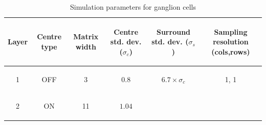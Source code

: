 \documentclass{frontiersENG} %
\newenvironment{mycell}[1]
{
	\begin{minipage}{#1}
		\begin{center}
			\vspace*{0.15cm}
		}
		{
			\vspace*{0.1cm}
		\end{center}
	\end{minipage}
}
\newenvironment{mycellS}[1]
{
  \begin{minipage}{#1}
    \begin{center}
    }
    {
      \vspace*{0.01cm}
    \end{center}
  \end{minipage}
}
\begin{document}
\begin{table}[htb]
	\caption{Simulation parameters for ganglion cells}
	\begin{center}
		
		
		
		\begin{tabular}{c c c c c c}
			\begin{mycellS}{0.8cm}\centering Layer \end{mycellS}& 
			\begin{mycellS}{1.1cm}\centering Centre type\end{mycellS}& 
			\begin{mycellS}{1.1cm}\centering Matrix width \end{mycellS}&  
			\begin{mycellS}{1.6cm}\centering Centre std. dev. ($\sigma_c$)\end{mycellS} & 
			\begin{mycellS}{1.6cm}\centering Surround std. dev. ($\sigma_s$)\end{mycellS} & 
			\begin{mycellS}{1.3cm}\centering Sampling resolution (cols,rows)\end{mycellS} \\
			\hline
			\begin{mycell}{0.8cm} 1  \end{mycell} &
			\begin{mycell}{1.1cm} \textsc{OFF} \end{mycell}& 
			\begin{mycell}{1.1cm} 3 \end{mycell}& 
			\begin{mycell}{1.6cm}$0.8$ \end{mycell}& 
      \begin{mycell}{1.6cm}$6.7 \times \sigma_c$ \end{mycell}&  
      \begin{mycell}{1.6cm}1, 1 \end{mycell}\\
			\begin{mycell}{0.8cm} 2 \end{mycell} & 
			\begin{mycell}{1.1cm} \textsc{ON} \end{mycell} & 
			\begin{mycell}{1.1cm} 11 \end{mycell}& 
			\begin{mycell}{1.6cm}$1.04$ \end{mycell}& 

\end{tabular}
\end{center}
\end{table}
\end{document}
